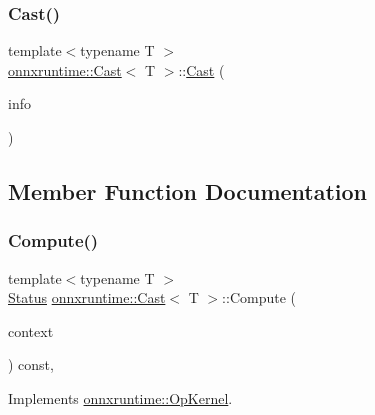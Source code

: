 \subsubsection{\texorpdfstring{Cast()}{Cast()}}
{\footnotesize\ttfamily template$<$typename T $>$ \\
\mbox{\hyperlink{classonnxruntime_1_1Cast}{onnxruntime\+::\+Cast}}$<$ T $>$\+::\mbox{\hyperlink{classonnxruntime_1_1Cast}{Cast}} (\begin{DoxyParamCaption}\item[{const \mbox{\hyperlink{classonnxruntime_1_1OpKernelInfo}{Op\+Kernel\+Info}} \&}]{info }\end{DoxyParamCaption})\hspace{0.3cm}{\ttfamily [inline]}}



\subsection{Member Function Documentation}
\mbox{\label{classonnxruntime_1_1Cast_ad1a2f4201ddd8dc51b8aebbb2b9fb5eb}} 
\subsubsection{\texorpdfstring{Compute()}{Compute()}\hspace{0.1cm}{\footnotesize\ttfamily [1/2]}}
{\footnotesize\ttfamily template$<$typename T $>$ \\
\mbox{\hyperlink{classonnxruntime_1_1common_1_1Status}{Status}} \mbox{\hyperlink{classonnxruntime_1_1Cast}{onnxruntime\+::\+Cast}}$<$ T $>$\+::Compute (\begin{DoxyParamCaption}\item[{\mbox{\hyperlink{classonnxruntime_1_1OpKernelContext}{Op\+Kernel\+Context}} $\ast$}]{context }\end{DoxyParamCaption}) const\hspace{0.3cm}{\ttfamily [override]}, {\ttfamily [virtual]}}



Implements \mbox{\hyperlink{classonnxruntime_1_1OpKernel_a9eca8656a78b1b3ab9d3351a12798650}{onnxruntime\+::\+Op\+Kernel}}.

\mbox{\label{classonnxruntime_1_1Cast_a572f4254b2fbd63f83c27f15b8f99e50}} 
